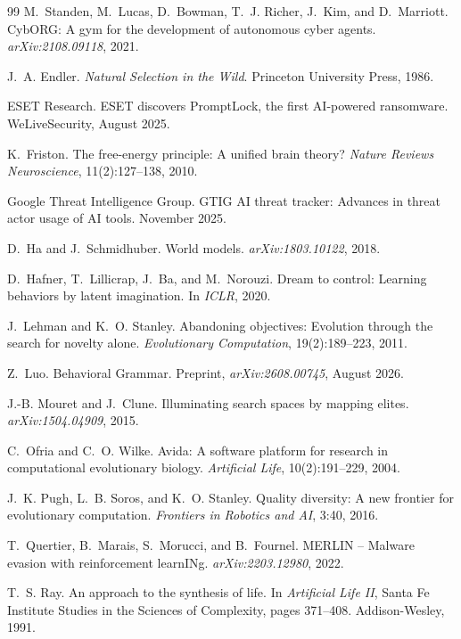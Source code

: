 \documentclass[11pt,a4paper]{article}
\begin{document}
\begin{thebibliography}{99}
M.~Standen, M.~Lucas, D.~Bowman, T.~J. Richer, J.~Kim, and D.~Marriott.
CybORG: A gym for the development of autonomous cyber agents.
\emph{arXiv:2108.09118}, 2021.

J.~A. Endler.
\emph{Natural Selection in the Wild}.
Princeton University Press, 1986.

ESET Research.
ESET discovers PromptLock, the first AI-powered ransomware.
WeLiveSecurity, August 2025.

K.~Friston.
The free-energy principle: A unified brain theory?
\emph{Nature Reviews Neuroscience}, 11(2):127--138, 2010.

Google Threat Intelligence Group.
GTIG AI threat tracker: Advances in threat actor usage of AI tools.
November 2025.

D.~Ha and J.~Schmidhuber.
World models.
\emph{arXiv:1803.10122}, 2018.

D.~Hafner, T.~Lillicrap, J.~Ba, and M.~Norouzi.
Dream to control: Learning behaviors by latent imagination.
In \emph{ICLR}, 2020.

J.~Lehman and K.~O. Stanley.
Abandoning objectives: Evolution through the search for novelty alone.
\emph{Evolutionary Computation}, 19(2):189--223, 2011.

Z.~Luo.
Behavioral Grammar.
Preprint, \emph{arXiv:2608.00745}, August 2026.

J.-B. Mouret and J.~Clune.
Illuminating search spaces by mapping elites.
\emph{arXiv:1504.04909}, 2015.

C.~Ofria and C.~O. Wilke.
Avida: A software platform for research in computational evolutionary biology.
\emph{Artificial Life}, 10(2):191--229, 2004.

J.~K. Pugh, L.~B. Soros, and K.~O. Stanley.
Quality diversity: A new frontier for evolutionary computation.
\emph{Frontiers in Robotics and AI}, 3:40, 2016.

T.~Quertier, B.~Marais, S.~Morucci, and B.~Fournel.
MERLIN -- Malware evasion with reinforcement learnINg.
\emph{arXiv:2203.12980}, 2022.

T.~S. Ray.
An approach to the synthesis of life.
In \emph{Artificial Life II}, Santa Fe Institute Studies in the Sciences of Complexity, pages 371--408. Addison-Wesley, 1991.


\end{thebibliography}
\end{document}
